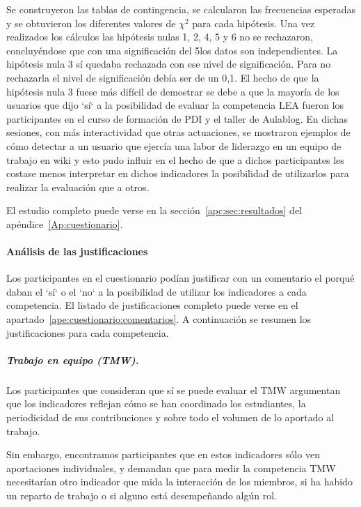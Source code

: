 Se construyeron las tablas de contingencia, se calcularon las frecuencias esperadas y se obtuvieron los diferentes valores de $\chi^2$ para cada hipótesis. Una vez realizados los cálculos las hipótesis nulas 1, 2, 4, 5 y 6 no se rechazaron, concluyéndose que con una significación del 5\percentage{ }los datos son independientes. La hipótesis nula 3 sí quedaba rechazada con ese nivel de significación. Para no rechazarla el nivel de significación debía ser de un 0,1\percentage. El hecho de que la hipótesis nula 3 fuese más difícil de demostrar se debe a que la mayoría de los usuarios que dijo `sí` a la posibilidad de evaluar la competencia LEA fueron los participantes en el curso de formación de PDI y el taller de Aulablog. En dichas sesiones, con más interactividad que otras actuaciones, se mostraron ejemplos de cómo detectar a un usuario que ejercía una labor de liderazgo en un equipo de trabajo en wiki y esto pudo influir en el hecho de que a dichos participantes les costase menos interpretar en dichos indicadores la posibilidad de utilizarlos para realizar la evaluación que a otros.

El estudio completo puede verse en la sección~\ref{apc:sec:resultados} del apéndice~\ref{Ap:cuestionario}.

\paragraph*{Análisis de las justificaciones}

Los participantes en el cuestionario podían justificar con un comentario el porqué daban el `sí` o el `no` a la posibilidad de utilizar los indicadores a cada competencia. El listado de justificaciones completo puede verse en el apartado~\ref{ape:cuestionario:comentarios}. A continuación se resumen los justificaciones para cada competencia.

\subparagraph*{Trabajo en equipo (TMW).}

Los participantes que consideran que sí se puede evaluar el TMW argumentan que los indicadores reflejan cómo se han coordinado los estudiantes, la periodicidad de sus contribuciones y sobre todo el volumen de lo aportado al trabajo.

Sin embargo, encontramos participantes que en estos indicadores sólo ven aportaciones individuales, y demandan que para medir la competencia TMW necesitarían otro indicador que mida la interacción de los miembros, si ha habido un reparto de trabajo o si alguno está desempeñando algún rol.

